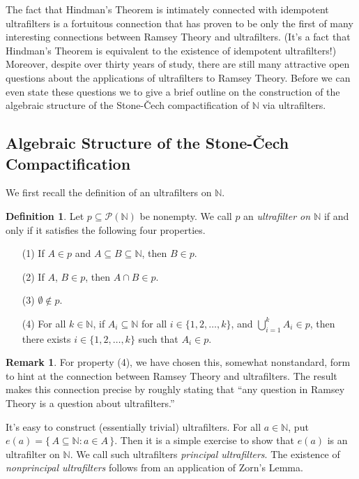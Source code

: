 \documentclass[12pt]{article}
\theoremstyle{plain}
\theoremstyle{definition}
\newtheorem{defn}[thm]{Definition}
\newtheorem{rmk}[thm]{Remark}
\newcommand{\bbN}{\mathbb{N}}
\begin{document}
The fact that Hindman's Theorem is intimately connected with
idempotent ultrafilters is a fortuitous connection that has proven to
be only the first of many interesting connections between Ramsey
Theory and ultrafilters.
(It's a fact that Hindman's Theorem is equivalent to the existence of
idempotent ultrafilters!)
Moreover, despite over thirty years of study, there are still many
attractive open questions about the applications of ultrafilters to
Ramsey Theory. 
Before we can even state these questions we to give a brief
outline on the construction of the algebraic structure of the
Stone-\v{C}ech compactification of $\bbN$ via ultrafilters.

\subsection{Algebraic Structure of the Stone-\v{C}ech Compactification}
We first recall the definition of an ultrafilters on $\bbN$.
  \begin{defn}
    \label{defn:uf}
    Let $p \subseteq \mathcal{P}(\bbN)$ be nonempty.
    We call $p$ an \textsl{ultrafilter on $\bbN$} if and only if it
    satisfies the following four properties.
      \begin{itemize}
        \item[(1)] If $A \in p$ and $A \subseteq B \subseteq \bbN$,
          then $B \in p$.
        \item[(2)] If $A$, $B \in p$, then $A \cap B \in p$.
        \item[(3)] $\emptyset \not\in p$.
        \item[(4)] For all $k \in \bbN$, if $A_i \subseteq \bbN$ for
          all $i \in \{1, 2, \ldots, k\}$, and $\bigcup_{i=1}^k A_i
          \in p$, then there exists $i \in \{1, 2, \ldots, k\}$ such
          that $A_i \in p$.
      \end{itemize}
  \end{defn}
  \begin{rmk}
    For property (4), we have chosen this, somewhat nonstandard, form
    to hint at the connection between Ramsey Theory and ultrafilters.
    The result \cite[Theorem 5.7]{Hindman:1998fk} makes this
    connection precise by roughly stating that ``any question in
    Ramsey Theory is a question about ultrafilters.''
  \end{rmk}

It's easy to construct (essentially trivial) ultrafilters. 
For all $a \in \bbN$, put $e(a) = \{\, A \subseteq \bbN : a \in A
\,\}$.
Then it is a simple exercise to show that $e(a)$ is an ultrafilter on
$\bbN$. 
We call such ultrafilters \textsl{principal ultrafilters}. 
The existence of \textsl{nonprincipal ultrafilters} follows from an
application of Zorn's Lemma. 
\end{document}

